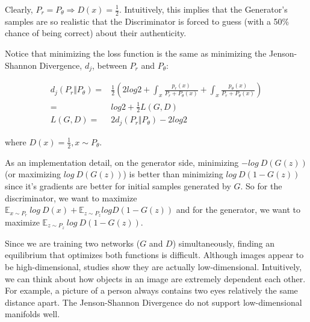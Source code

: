 Clearly, $P_r = P_\theta \Rightarrow D(x) = \frac{1}{2}$. Intuitively, this implies that the Generator's samples are so realistic that the Discriminator is forced to guess (with a 50\% chance of being correct) about their authenticity. 

Notice that minimizing the loss function is the same as minimizing the Jenson-Shannon Divergence, $d_j$, between $P_r$ and $P_\theta$:

\begin{align}
	d_j(P_r \Vert P_\theta) =& \frac{1}{2} \left( 2log2 + \int_{x}^{} \frac{p_r(x)}{P_r + P_\theta(x)} + \int_{x}^{} \frac{p_\theta(x)}{P_r + P_\theta(x)} \right) \nonumber \\
	=& log2 + \frac{1}{2} L(G, D) \nonumber \\
	L(G, D) =& 2d_j(P_r \Vert P_\theta) - 2log2
\end{align}

where $D(x) = \frac{1}{2}, x \sim P_\theta$. 

As an implementation detail, on the generator side, minimizing $-log~D(G(z))$ (or maximizing $log~D(G(z))$) is better than minimizing $log~D(1-G(z))$ since it's gradients are better for initial samples generated by $G$. So for the discriminator, we want to maximize $\mathbb{E}_{x \sim P_r}~log~D(x) + \mathbb{E}_{z \sim P_z} log D(1-G(z))$ and for the generator, we want to maximize $\mathbb{E}_{z \sim P_z}~log~D(1-G(z))$.

Since we are training two networks ($G$ and $D$) simultaneously, finding an equilibrium that optimizes both functions is difficult. Although images appear to be high-dimensional, studies show they are actually low-dimensional. Intuitively, we can think about how objects in an image are extremely dependent each other. For example, a picture of a person always contains two eyes relatively the same distance apart. The Jenson-Shannon Divergence do not support low-dimensional manifolds well. 

